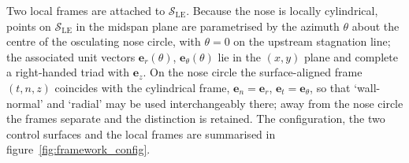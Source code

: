 \documentclass[lineno]{JFM-FLM_Au}
\begin{document}
Two local frames are attached to $\mathcal{S}_{\mathrm{LE}}$. Because the
nose is locally cylindrical, points on $\mathcal{S}_{\mathrm{LE}}$ in the
midspan plane are parametrised by the azimuth $\theta$ about the centre of
the osculating nose circle, with $\theta = 0$ on the upstream stagnation
line; the associated unit vectors $\boldsymbol{e}_r(\theta)$,
$\boldsymbol{e}_\theta(\theta)$ lie in the $(x,y)$ plane and complete a
right-handed triad with $\boldsymbol{e}_z$. On the nose circle the
surface-aligned frame $(t,n,z)$ coincides with the cylindrical frame,
$\boldsymbol{e}_n = \boldsymbol{e}_r$,
$\boldsymbol{e}_t = \boldsymbol{e}_\theta$, so that `wall-normal' and
`radial' may be used interchangeably there; away from the nose circle the
frames separate and the distinction is retained. The configuration, the two control surfaces and the local frames are
summarised in figure~\ref{fig:framework_config}.
\end{document}
